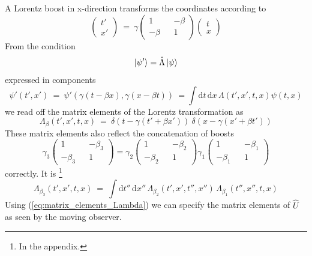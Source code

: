 \documentclass[12pt]{article}
\begin{document}
A Lorentz boost in x-direction transforms the coordinates according to
\begin{equation*}
\begin{pmatrix} t' \\ x' \end{pmatrix}\ =\ 
\gamma \begin{pmatrix} 1 && -\beta \\ -\beta && 1 \end{pmatrix}
\begin{pmatrix} t \\ x \end{pmatrix}
\end{equation*}
From the condition 
\begin{equation*}
\ket{\psi'}=\hat{\Lambda}\ket{\psi}
\end{equation*}
expressed in components
\begin{equation*}
\psi'(t',x')\ =\ \psi'(\gamma(t-\beta x),\gamma(x-\beta t))\ = \int \mathrm{d}t\,\mathrm{d}x\, \Lambda(t',x',t,x) \psi(t,x)
\end{equation*}
we read off the matrix elements of the Lorentz transformation as
\begin{equation}\label{eq:matrix_elements_Lambda}
\Lambda_\beta(t',x',t,x)\ =\ \delta(t-\gamma(t'+\beta x'))\ \delta(x-\gamma(x'+\beta t'))
\end{equation}
These matrix elements also reflect the concatenation of boosts 
\begin{equation*}
\gamma_3 \begin{pmatrix} 1 && -\beta_3 \\ -\beta_3 && 1 \end{pmatrix} =
\gamma_2 \begin{pmatrix} 1 && -\beta_2 \\ -\beta_2 && 1 \end{pmatrix}
\gamma_1 \begin{pmatrix} 1 && -\beta_1 \\ -\beta_1 && 1 \end{pmatrix}
\end{equation*}
correctly. It is \footnote{In the appendix.}
\begin{equation} \label{eq:chained_boosts}
\Lambda_{\beta_3}(t',x',t,x)\ =\ \int \mathrm{d}t''\,\mathrm{d}x''\, \Lambda_{\beta_2}(t',x',t'',x'')\, \Lambda_{\beta_1}(t'',x'',t,x)
\end{equation}
Using (\ref{eq:matrix_elements_Lambda}) we can specify the matrix elements of $\hat{U}$ as seen by the moving observer.
\end{document}
